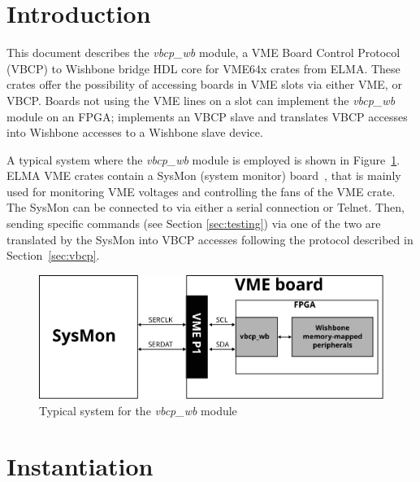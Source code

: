 \documentclass[a4paper,11pt]{article}
\begin{document}
\section{Introduction}
\label{sec:intro}

This document describes the \textit{vbcp\_wb} module, a VME Board Control Protocol (VBCP) to Wishbone
bridge HDL core for VME64x crates from ELMA. These crates offer the possibility of accessing
boards in VME slots via either VME, or VBCP. Boards not using the VME lines
on a slot can implement the \textit{vbcp\_wb} module on an FPGA; implements an
VBCP slave and translates VBCP accesses into Wishbone \cite{wb-spec} accesses to a
Wishbone slave device.

A typical system where the \textit{vbcp\_wb} module is employed is shown in
Figure~\ref{fig:sys}. ELMA VME crates contain a SysMon (system monitor) board~\cite{sysmon},
that is mainly used for monitoring VME voltages and controlling the fans of the VME crate.
The SysMon can be connected to via either a serial connection or Telnet. Then, sending
specific commands (see Section \ref{sec:testing}) via one of the two are translated by the
SysMon into VBCP accesses following the protocol described in Section~\ref{sec:vbcp}.

\begin{figure}[h]
  \centerline{\includegraphics[width=\textwidth]{fig/sys}}
  \caption{Typical system for the \textit{vbcp\_wb} module}
  \label{fig:sys}
\end{figure}

\section{Instantiation}
\label{sec:instantiation}
\end{document}
